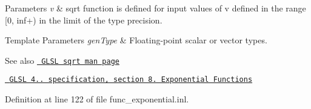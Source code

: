 \begin{DoxyParams}{Parameters}
{\em v} & sqrt function is defined for input values of v defined in the range \mbox{[}0, inf+) in the limit of the type precision. \\
\hline
\end{DoxyParams}

\begin{DoxyTemplParams}{Template Parameters}
{\em gen\+Type} & Floating-\/point scalar or vector types.\\
\hline
\end{DoxyTemplParams}
\begin{DoxySeeAlso}{See also}
\href{http://www.opengl.org/sdk/docs/manglsl/xhtml/sqrt.xml}{\texttt{ G\+L\+SL sqrt man page}} 

\href{http://www.opengl.org/registry/doc/GLSLangSpec.4.20.8.pdf}{\texttt{ G\+L\+SL 4.. specification, section 8. Exponential Functions}} 
\end{DoxySeeAlso}


Definition at line 122 of file func\+\_\+exponential.\+inl.

